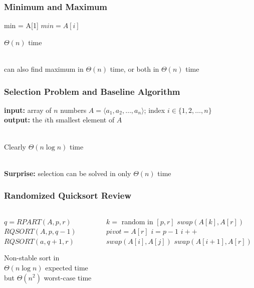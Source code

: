 \documentclass[10pt,aspectratio=169]{beamer}
\newcommand{\stanza}{ \\~\ }
\begin{document}
\begin{frame} \frametitle{Minimum and Maximum}
  \begin{algorithmic}[1]
    \State min = A[1]
        \State $min = A[i]$
      \EndIf
    \EndFor
    \State {}
    \EndFunction
  \end{algorithmic}
  \vspace{.5cm}

  $\Theta(n)$ time \stanza

  can also find maximum in $\Theta(n)$ time, or both in $\Theta(n)$ time
\end{frame}

\begin{frame} \frametitle{Selection Problem and Baseline Algorithm}
\textbf{input:} array of $n$ numbers $A=\langle a_1, a_2, \ldots, a_n \rangle$;
  index $i \in \{1, 2, \ldots, n\}$\\
\textbf{output:} the $i$th smallest element of $A$ \stanza

\begin{algorithmic}[1]
  \State {}
  \EndFunction
\end{algorithmic}
\vspace{.5cm}
Clearly $\Theta(n \log n)$ time \stanza

\textbf{Surprise:} selection can be solved in only $\Theta(n)$ time
\end{frame}

\begin{frame} \frametitle{Randomized Quicksort Review}
\begin{columns}
\begin{column}{0.5\textwidth}
  \begin{algorithmic}[1]
      \State $q = RPART(A, p, r)$
      \State $RQSORT(A, p, q-1)$
      \State $RQSORT(a, q+1, r)$
    \EndIf
    \EndFunction
  \end{algorithmic}
  \vspace{.5cm}
  Non-stable sort in $\Theta(n \log n)$ expected time but
  $\Theta(n^2)$ worst-case time
\end{column}
\begin{column}{0.5\textwidth}
  \begin{algorithmic}[1]
    \State $k = $ random in $[p, r]$ 
    \State $swap(A[k], A[r])$ 
    \State $pivot = A[r]$ 
    \State $i = p - 1$ 
      \State $i++$
      \State $swap(A[i], A[j])$
      \EndIf
    \EndFor
    \State $swap(A[i+1], A[r])$ 
    \State {}
    \EndFunction
  \end{algorithmic}
\end{column}
\end{columns}
\end{frame}
\end{document}
